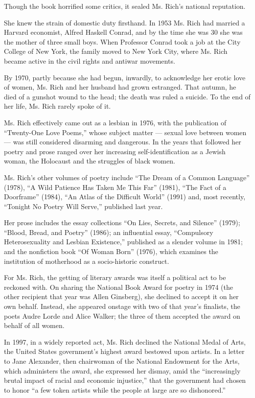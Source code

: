 Though the book horrified some critics, it sealed Ms. Rich's national
reputation.

She knew the strain of domestic duty firsthand. In 1953 Ms. Rich had
married a Harvard economist, Alfred Haskell Conrad, and by the time she
was 30 she was the mother of three small boys. When Professor Conrad
took a job at the City College of New York, the family moved to New York
City, where Ms. Rich became active in the civil rights and antiwar
movements.

By 1970, partly because she had begun, inwardly, to acknowledge her
erotic love of women, Ms. Rich and her husband had grown estranged. That
autumn, he died of a gunshot wound to the head; the death was ruled a
suicide. To the end of her life, Ms. Rich rarely spoke of it.

Ms. Rich effectively came out as a lesbian in 1976, with the publication
of ``Twenty-One Love Poems,'' whose subject matter --- sexual love
between women --- was still considered disarming and dangerous. In the
years that followed her poetry and prose ranged over her increasing
self-identification as a Jewish woman, the Holocaust and the struggles
of black women.

Ms. Rich's other volumes of poetry include ``The Dream of a Common
Language'' (1978), ``A Wild Patience Has Taken Me This Far'' (1981),
``The Fact of a Doorframe'' (1984), ``An Atlas of the Difficult World''
(1991) and, most recently, ``Tonight No Poetry Will Serve,'' published
last year.

Her prose includes the essay collections ``On Lies, Secrets, and
Silence'' (1979); ``Blood, Bread, and Poetry'' (1986); an influential
essay, ``Compulsory Heterosexuality and Lesbian Existence,'' published
as a slender volume in 1981; and the nonfiction book ``Of Woman Born''
(1976), which examines the institution of motherhood as a socio-historic
construct.

For Ms. Rich, the getting of literary awards was itself a political act
to be reckoned with. On sharing the National Book Award for poetry in
1974 (the other recipient that year was Allen Ginsberg), she declined to
accept it on her own behalf. Instead, she appeared onstage with two of
that year's finalists, the poets Audre Lorde and Alice Walker; the three
of them accepted the award on behalf of all women.

In 1997, in a widely reported act, Ms. Rich declined the National Medal
of Arts, the United States government's highest award bestowed upon
artists. In a letter to Jane Alexander, then chairwoman of the National
Endowment for the Arts, which administers the award, she expressed her
dismay, amid the ``increasingly brutal impact of racial and economic
injustice,'' that the government had chosen to honor ``a few token
artists while the people at large are so dishonored.''

